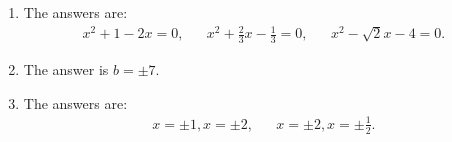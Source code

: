 \begin{enumerate}
	\item 	The answers are:
	\begin{align*}
	x^2+1-2x=0,&& x^2+\frac{2}{3}x-\frac{1}{3}=0,&&  x^2-\sqrt{2}x-4=0.
	\end{align*}
	
	
	\item The answer is $b=\pm 7$. 
	
	\item The answers are:
	\begin{align*}
	x=\pm1,x=\pm 2,&& x=\pm 2,x=\pm \frac{1}{2}.
	\end{align*}

	

	
\end{enumerate}